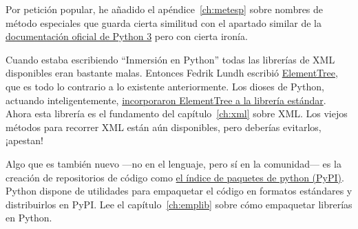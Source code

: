 Por petición popular, he añadido el apéndice~\ref{ch:metesp} sobre nombres de método especiales que guarda cierta similitud con el apartado similar de la \href{http://www.python.org/doc/3.1/reference/datamodel.html#special-method-names}{documentación oficial de Python 3} pero con cierta ironía.

Cuando estaba escribiendo ``Inmersión en Python'' todas las librerías de XML disponibles eran bastante malas. Entonces Fedrik Lundh escribió \href{http://effbot.org/zone/element-index.htm}{ElementTree}, que es todo lo contrario a lo existente anteriormente. Los dioses de Python, actuando inteligentemente, \href{http://docs.python.org/3.1/library/xml.etree.elementtree.html}{incorporaron ElementTree a la librería estándar}. Ahora esta librería es el fundamento del capítulo~\ref{ch:xml} sobre XML. Los viejos métodos para recorrer XML están aún disponibles, pero deberías evitarlos, ¡apestan!

Algo que es también nuevo ---no en el lenguaje, pero sí en la comunidad--- es la creación de repositorios de código como \href{http://pypi.python.org/}{el índice de paquetes de python (PyPI)}. Python dispone de utilidades para empaquetar el código en formatos estándares y distribuirlos en PyPI. Lee el capítulo~\ref{ch:emplib} sobre  cómo empaquetar librerías en Python.
\newpage
